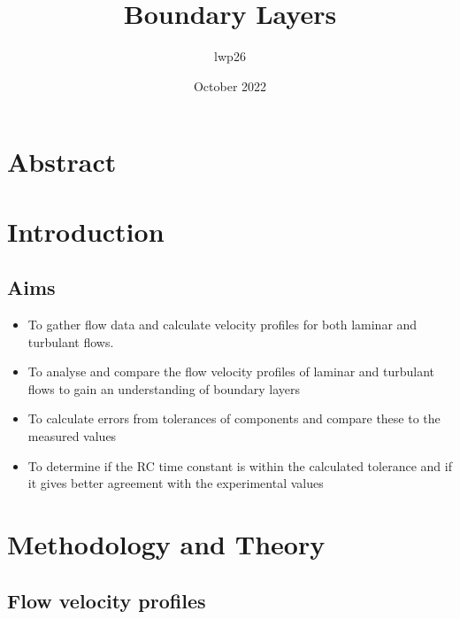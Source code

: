 \documentclass{article}
\begin{document}
\title{Boundary Layers}
\author{lwp26 }
\date{October 2022}

\section{Abstract}

\section{Introduction}


\subsection{Aims}

\begin{itemize}

\item To gather flow data and calculate velocity profiles for both laminar and turbulant flows.
\item To analyse and compare the flow velocity profiles of laminar and turbulant flows to gain an understanding of boundary layers
\item To calculate errors from tolerances of components and compare these to the measured values
\item To determine if the RC time constant is within the calculated tolerance and if it gives better agreement with the experimental values

\end{itemize}

\section{Methodology and Theory}


\subsection{Flow velocity profiles}
\end{document}
